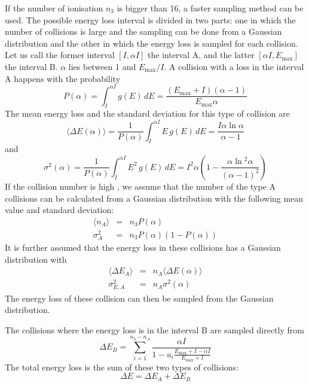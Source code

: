 \documentclass{article}
\newcommand{\Emax}{\ensuremath{E_{\mathrm{max}}}}
\begin{document}
If the number of ionisation $n_3$ is bigger than 16, a faster sampling
method can be used. The possible energy loss interval is divided in
two parts: one in which the number of collisions is large and the
sampling can be done from a Gaussian distribution and the other in
which the energy loss is sampled for each collision.  Let us call the
former interval $[I, \alpha I]$ the interval A, and the latter
$[\alpha I,\Emax]$ the interval B.  $\alpha$ lies between 1 and
$\Emax/I$.  A collision with a loss in the interval A happens with
the probability
\begin{equation}
\label{eq:phys332-5}
P(\alpha) = \int_I^{\alpha I} g(\!E\!) \, dE =
            \frac {( \Emax + I) (\alpha - 1)}{\Emax \alpha}
\end{equation}
The mean energy loss and the standard deviation for this type
of collision are
\begin{equation}
\langle \Delta E(\alpha) \rangle = \frac{1}{P(\alpha)}
        \int_I^{\alpha I} E \, g(\!E\!) \, dE =
        \frac{I \alpha \ln \alpha}{\alpha - 1}
\end{equation}
and
\begin{equation}
\sigma^2(\alpha) = \frac{1}{P(\alpha)}
        \int_I^{\alpha I} E^2 \, g(\!E\!) \, dE =
        I^2 \alpha \left( 1 - \frac{\alpha \ln \! ^2 \alpha}{(\alpha - 1)^2} \right)
\end{equation}
If the collision number is high , we assume that the number of the
type A collisions can be calculated from a Gaussian distribution
with the following mean value and standard deviation:
\begin{eqnarray}
\label{eq:phys332-1}
\langle n_A \rangle & = & n_3 P(\alpha) \\
\label{eq:phys332-2}
\sigma_A^2     & = & n_3 P(\alpha) ( 1 - P(\alpha))
\end{eqnarray}
It is further assumed that the energy loss in these collisions
has a Gaussian distribution with
\begin{eqnarray}
\label{eq:phys332-3}
\langle \Delta E_A \rangle & = & n_A  \langle \Delta E(\alpha) \rangle \\
\label{eq:phys332-4}
\sigma_{E,A}^2             & = & n_A \sigma^2(\alpha)
\end{eqnarray}
The energy loss of these collision can then be sampled from the
Gaussian distribution.

The collisions where the energy loss is in the interval B are sampled
directly from
\begin{equation}
\Delta E_B = \sum_{i=1}^{n_3 - n_A} \frac{\alpha I}
            {1 - u_i \frac{\Emax + I - \alpha I}{\Emax + I}}
\end{equation}
The total energy loss is the sum of these two types of collisions:
\begin{equation}
\Delta E =  \Delta E_A + \Delta E_B
\end{equation}
\end{document}
